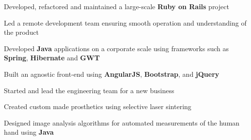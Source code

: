 \documentclass[]{resume}
\begin{document}
\begin{minipage}[t]{0.66\textwidth}
\begin{tightemize}
\item Developed, refactored and maintained a large-scale \textbf{Ruby on Rails} project
\item Led a remote development team ensuring smooth operation and understanding of the product
\end{tightemize}
\sectionsep

\begin{tightemize}
\item Developed \textbf{Java} applications on a corporate scale using frameworks such as \textbf{Spring}, \textbf{Hibernate} and \textbf{GWT}
\item Built an agnostic front-end using \textbf{AngularJS}, \textbf{Bootstrap}, and \textbf{jQuery}
\end{tightemize}
\sectionsep



\begin{tightemize}
\item Started and lead the engineering team for a new business
\item Created custom made prosthetics using selective laser sintering
\item Designed image analysis algorithms for automated measurements of the human hand using \textbf{Java}
\end{tightemize}
\sectionsep


\end{minipage}
\end{document}
